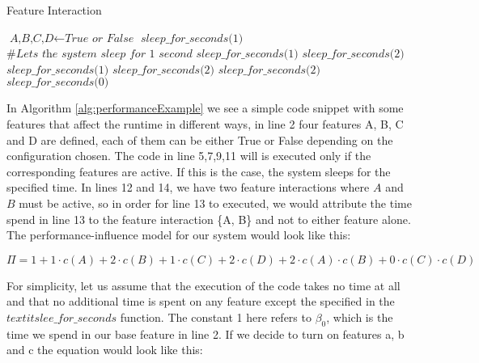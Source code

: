 \makeatletter
\def\BState{\State\hskip-\ALG@thistlm}
\makeatother

\begin{algorithm}
\caption{Feature Interaction \label{alg:performanceExample}}
\begin{algorithmic}[1]
\State $\textit{A,B,C,D} \gets \textit{True or False}$\label{alg:code_insertion}
\State $\textit{sleep\_for\_seconds(1)}$ $\textit{\#Lets the system sleep for 1 second}$
    \State $\textit{sleep\_for\_seconds(1)}$
\EndIf
{} 
    \State $\textit{sleep\_for\_seconds(2)}$
\EndIf
{} 
    \State $\textit{sleep\_for\_seconds(1)}$ \label{alg:onlyC}
\EndIf
{} 
    \State $\textit{sleep\_for\_seconds(2)}$ \label{alg:onlyD}
\EndIf
{} 
    \State $\textit{sleep\_for\_seconds(2)}$
\EndIf
{} 
    \State $\textit{sleep\_for\_seconds(0)}$ \label{alg:CandD}
\EndIf

\EndProcedure
\end{algorithmic}
\end{algorithm}


In Algorithm \ref{alg:performanceExample} we see a simple code snippet with some features that affect the runtime in different ways, in line 
2 four features A, B, C and D are defined, each of them can be either True or False depending on the configuration chosen. The code in
line 5,7,9,11 will is executed only if the corresponding features are active. If this is the case, the system sleeps for the specified time. In lines
12 and 14, we have two feature interactions where $A$ and $B$ must be active, so in order for line 13 to executed, we would attribute the time spend
in line 13 to the feature interaction \{A, B\} and not to either feature alone.
The performance-influence model for our system would look like this:

\begin{equation*}
    \Pi = 1 + 1 \cdot c(A) + 2\cdot c(B) + 1\cdot c(C) + 2\cdot c(D) + 2 \cdot c(A)\cdot c(B) + 0\cdot c(C) \cdot c(D)
\end{equation*}

For simplicity, let us assume that the execution of the code takes no time at all and that no additional time is spent on any feature except 
the specified in the $textit{slee\_for\_seconds}$ function. The constant 1 here refers to $\beta_0$, which is the time we spend in our base 
feature in line 2. If we decide to turn on features a, b and c the equation would look like this:

